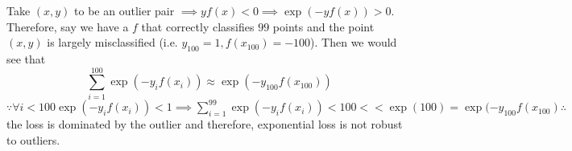 \tffalse

Take $(x, y)$ to be an outlier pair $\implies y f(x) < 0 \implies \exp(-y f(x)) > 0$. Therefore, say we have a $f$ that correctly classifies $99$ points and the point $(x, y)$ is largely misclassified (i.e. $y_{100} = 1, f(x_{100}) = -100$). Then we would see that 
$$
\sum_{i=1}^{100} \exp(-y_i f(x_i)) \approx \exp(-y_{100} f(x_{100}))
$$
$\because \forall i < 100 \exp(-y_i f(x_i)) < 1 \implies \sum_{i=1}^{99} \exp(-y_i f(x_i)) < 100 << \exp(100) = \exp(-y_{100} f(x_{100}) \therefore$ the loss is dominated by the outlier and therefore, exponential loss is not robust to outliers.